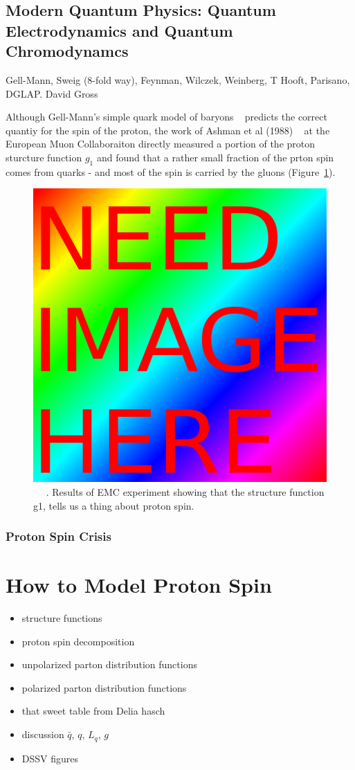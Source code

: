 \subsection{Modern Quantum Physics: Quantum Electrodynamics and Quantum Chromodynamcs}

Gell-Mann, Sweig (8-fold way), Feynman, Wilczek, Weinberg, T Hooft, Parisano,
DGLAP. David Gross

Although Gell-Mann's simple quark model of baryons ~\needcite{} predicts the
correct quantiy for the spin of the proton, the work of Ashman et al (1988)
~\needcite{} at the European Muon Collaboraiton directly measured a portion of
the proton sturcture function $g_1$ and found that a rather small fraction of
the prton spin comes from quarks - and most of the spin is carried by the
gluons (Figure~\ref{fig:emc_g1_result}). 

\begin{figure}[ht]
	\begin{center}
	\includegraphics[width=0.5\linewidth]{../filler/squareimg.png}
	\caption{~\needfig{} ~\needcap{}. Results of EMC experiment showing that the structure
	function g1, tells us a thing about proton spin.}
	\label{fig:emc_g1_result}
\end{center}
\end{figure}

\subsubsection{Proton Spin Crisis}

\section{How to Model Proton Spin}
\begin{itemize}
		\item structure functions
		\item proton spin decomposition
		\item unpolarized parton distribution functions
		\item polarized parton distribution functions
		\item that sweet table from Delia hasch
		\item discussion $\bar{q}$, $q$, $L_q$, $g$
		\item DSSV figures
\end{itemize}
